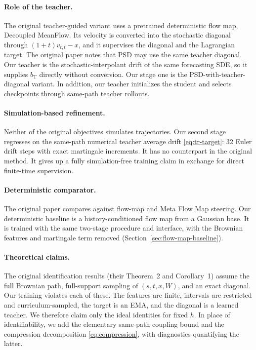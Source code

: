 \paragraph{Role of the teacher.} The original teacher-guided variant uses a pretrained deterministic flow map, Decoupled MeanFlow. Its velocity is converted into the stochastic diagonal through $(1+t)v_{t,t}-x$, and it supervises the diagonal and the Lagrangian target. The original paper notes that PSD may use the same teacher diagonal. Our teacher is the stochastic-interpolant drift of the same forecasting SDE, so it supplies $b_{\mathrm T}$ directly without conversion. Our stage one is the PSD-with-teacher-diagonal variant. In addition, our teacher initializes the student and selects checkpoints through same-path teacher rollouts.

\paragraph{Simulation-based refinement.} Neither of the original objectives simulates trajectories. Our second stage regresses on the same-path numerical teacher average drift \eqref{eq:tr-target}: 32 Euler drift steps with exact martingale increments. It has no counterpart in the original method. It gives up a fully simulation-free training claim in exchange for direct finite-time supervision.

\paragraph{Deterministic comparator.} The original paper compares against flow-map and Meta Flow Map steering. Our deterministic baseline is a history-conditioned flow map from a Gaussian base. It is trained with the same two-stage procedure and interface, with the Brownian features and martingale term removed (Section~\ref{sec:flow-map-baseline}).

\paragraph{Theoretical claims.} The original identification results (their Theorem~2 and Corollary~1) assume the full Brownian path, full-support sampling of $(s,t,x,W)$, and an exact diagonal. Our training violates each of these. The features are finite, intervals are restricted and curriculum-sampled, the target is an EMA, and the diagonal is a learned teacher. We therefore claim only the ideal identities for fixed $h$. In place of identifiability, we add the elementary same-path coupling bound and the compression decomposition \eqref{eq:compression}, with diagnostics quantifying the latter.

